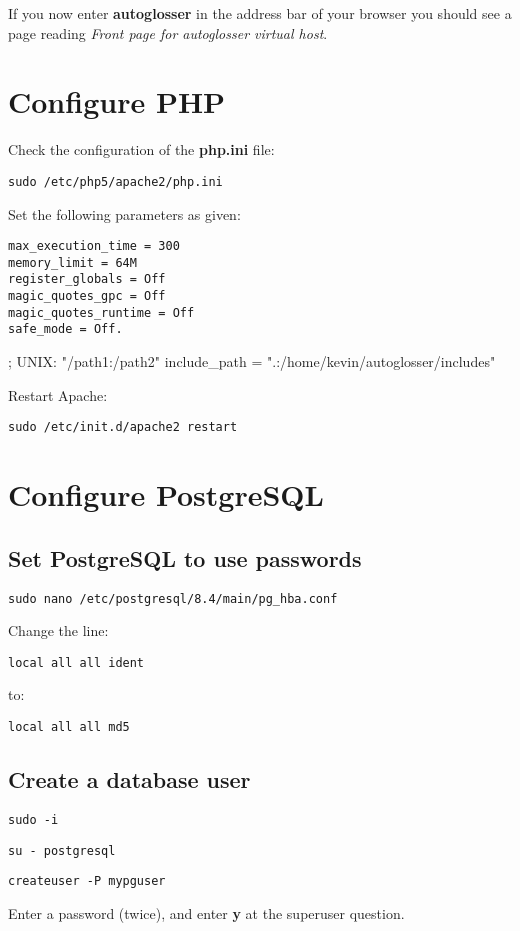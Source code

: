 \documentclass[a4paper,10pt]{article}
\begin{document}
If you now enter \textbf{autoglosser} in the address bar of your browser you should see a page reading \textit{Front page for autoglosser virtual host}.

\section{Configure PHP}

Check the configuration of the \textbf{php.ini} file:

\texttt{sudo /etc/php5/apache2/php.ini}

Set the following parameters as given:

\begin{verbatim}
max_execution_time = 300
memory_limit = 64M
register_globals = Off
magic_quotes_gpc = Off
magic_quotes_runtime = Off
safe_mode = Off.
\end{verbatim}

; UNIX: "/path1:/path2"
include\_path = ".:/home/kevin/autoglosser/includes"


Restart Apache:

\texttt{sudo /etc/init.d/apache2 restart}

\section{Configure PostgreSQL}

\subsection{Set PostgreSQL to use passwords}

\texttt{sudo nano /etc/postgresql/8.4/main/pg\_hba.conf}

Change the line:

\texttt{local   all	all	ident}

to:

\texttt{local   all	all	md5}

\subsection{Create a database user}
\label{subsec:create-db-user}

\texttt{sudo -i}

\texttt{su - postgresql}

\texttt{createuser -P mypguser}

Enter a password (twice), and enter \textbf{y} at the superuser question.
\end{document}
